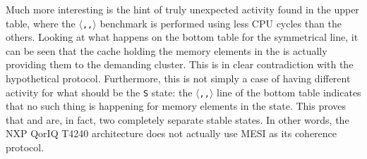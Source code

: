 Much more interesting is the hint of truly unexpected activity found in the
upper table, where the \texttt{$\langle$\benchi{},\benchi{},\benchs{}$\rangle$}
benchmark is performed using less CPU cycles than the others. Looking at what
happens on the bottom table for the symmetrical line, it can be seen that the
cache holding the memory elements in the \benchs{} is actually providing them to
the demanding cluster. This is in clear contradiction with the hypothetical
protocol. Furthermore, this is not simply a case of having different activity
for what should be the \texttt{S} state: the
\texttt{$\langle$\benchx{},\benchi{},\benchi{}$\rangle$} line of the bottom
table indicates that no such thing is happening for memory elements in the
\benchx{} state. This proves that \benchs{} and \benchx{} are, in fact, two
completely separate stable states. In other words, the NXP QorIQ T4240
architecture does not actually use MESI as its coherence protocol.
